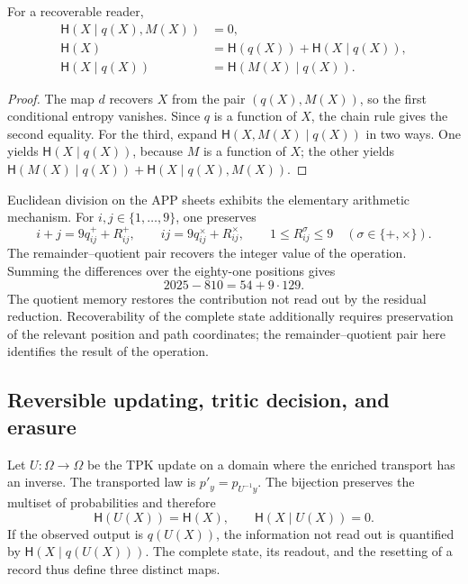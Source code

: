 \begin{proposition}
For a recoverable reader,
\begin{align}
 \mathsf H(X\mid q(X),M(X))&=0,\\
 \mathsf H(X)&=\mathsf H(q(X))+\mathsf H(X\mid q(X)),\\
 \mathsf H(X\mid q(X))&=\mathsf H(M(X)\mid q(X)).
 \label{v:ant:eq:ii-kb-aut-fibra}
\end{align}
\end{proposition}
\begin{proof}
The map \(d\) recovers \(X\) from the pair \((q(X),M(X))\),
so the first conditional entropy vanishes. Since \(q\) is a
function of \(X\), the chain rule gives the second equality.
For the third, expand
\(\mathsf H(X,M(X)\mid q(X))\) in two ways. One yields
\(\mathsf H(X\mid q(X))\), because \(M\) is a function of \(X\);
the other yields
\(\mathsf H(M(X)\mid q(X))+\mathsf H(X\mid q(X),M(X))\).
\end{proof}

Euclidean division on the APP sheets exhibits the elementary
arithmetic mechanism. For \(i,j\in\{1,\ldots,9\}\), one preserves
\[
 i+j=9q^+_{ij}+R^+_{ij},\qquad
 ij=9q^\times_{ij}+R^\times_{ij},\qquad
 1\leq R^\sigma_{ij}\leq9\quad(\sigma\in\{+,\times\}).
\]
The remainder--quotient pair recovers the integer value of the operation.
Summing the differences over the eighty-one positions gives
\[
 2025-810=54+9\cdot129.
\]
The quotient memory restores the contribution not read out by the
residual reduction. Recoverability of the complete state additionally
requires preservation of the relevant position and path coordinates;
the remainder--quotient pair here identifies the result of the operation.

\subsection{Reversible updating, tritic decision, and erasure}

Let \(U:\Omega\to\Omega\) be the TPK update on a domain where
the enriched transport has an inverse. The transported law is
\(p'_y=p_{U^{-1}y}\). The bijection preserves the multiset of
probabilities and therefore
\begin{equation}
 \mathsf H(U(X))=\mathsf H(X),\qquad
 \mathsf H(X\mid U(X))=0.
 \label{v:ant:eq:ii-kb-aut-reversible}
\end{equation}
If the observed output is \(q(U(X))\), the information not read out
is quantified by \(\mathsf H(X\mid q(U(X)))\). The complete state,
its readout, and the resetting of a record thus define three distinct maps.


